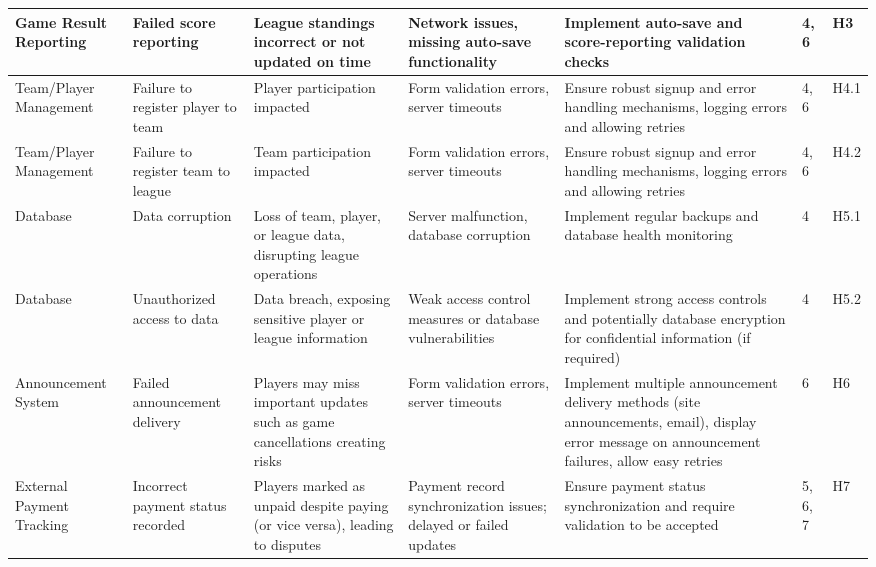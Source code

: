 \documentclass{article}
\begin{document}
\begin{landscape}
\begin{table}[hp]
\begin{footnotesize}
\begin{tabular}{|p{1in}|p{1in}|p{1in}|p{1.5in}|p{2.5in}|p{0.2in}|p{0.2in}|}
        \hline
        Game Result Reporting & Failed score reporting & League standings incorrect or not updated on time & Network issues, missing auto-save functionality & Implement auto-save and score-reporting validation checks & 4, 6 & H3 \\
        \hline
        Team/Player Management & Failure to register player to team & Player participation impacted & Form validation errors, server timeouts & Ensure robust signup and error handling mechanisms, logging errors and allowing retries & 4, 6 & H4.1 \\
        \hline
        Team/Player Management & Failure to register team to league & Team participation impacted & Form validation errors, server timeouts & Ensure robust signup and error handling mechanisms, logging errors and allowing retries & 4, 6 & H4.2 \\
        \hline
        Database & Data corruption & Loss of team, player, or league data, disrupting league operations & Server malfunction, database corruption & Implement regular backups and database health monitoring & 4 & H5.1 \\
        \hline

        Database & Unauthorized access to data & Data breach, exposing sensitive player or league information & Weak access control measures or database vulnerabilities  & Implement strong access controls and potentially database encryption for confidential information (if required) & 4 & H5.2 \\
        \hline

        Announcement System & Failed announcement delivery & Players may miss important updates such as game cancellations creating risks & Form validation errors, server timeouts & Implement multiple announcement delivery methods (site announcements, email), display error message on announcement failures, allow easy retries  & 6 & H6 \\
        \hline
      
        External Payment Tracking & Incorrect payment status recorded & Players marked as unpaid despite paying (or vice versa), leading to disputes & Payment record synchronization issues; delayed or failed updates & Ensure payment status synchronization and require validation to be accepted & 5, 6, 7& H7 \\

        \hline
        \bottomrule
    \end{tabular}
    \end{footnotesize}
\end{table}
\end{landscape}
\restoregeometry
\end{document}
